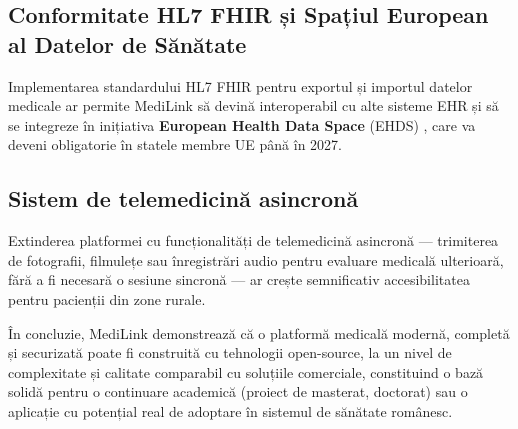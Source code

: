 \subsection{Conformitate HL7 FHIR și Spațiul European al Datelor de Sănătate}

Implementarea standardului HL7 FHIR pentru exportul și importul datelor medicale ar permite MediLink să devină interoperabil cu alte sisteme EHR și să se integreze în inițiativa \textbf{European Health Data Space} (EHDS) \cite{ehds2022}, care va deveni obligatorie în statele membre UE până în 2027.

\subsection{Sistem de telemedicină asincronă}

Extinderea platformei cu funcționalități de telemedicină asincronă — trimiterea de fotografii, filmulețe sau înregistrări audio pentru evaluare medicală ulterioară, fără a fi necesară o sesiune sincronă — ar crește semnificativ accesibilitatea pentru pacienții din zone rurale.

În concluzie, MediLink demonstrează că o platformă medicală modernă, completă și securizată poate fi construită cu tehnologii open-source, la un nivel de complexitate și calitate comparabil cu soluțiile comerciale, constituind o bază solidă pentru o continuare academică (proiect de masterat, doctorat) sau o aplicație cu potențial real de adoptare în sistemul de sănătate românesc.
